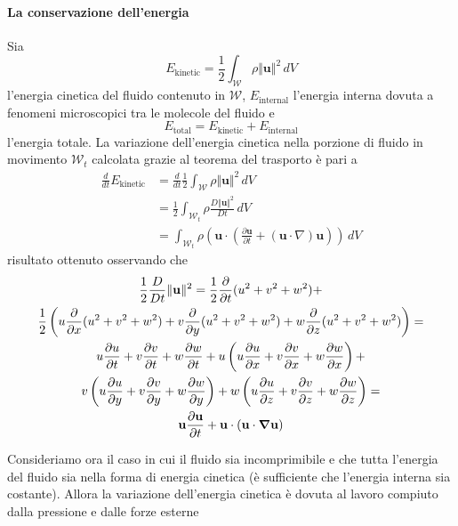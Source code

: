 \paragraph{La conservazione dell'energia}
Sia
\begin{equation*}
E_{\text{kinetic}} = \frac{1}{2} \int_{\mathcal{W}} \rho \Vert \mathbf{u} \Vert^2 \, dV
\end{equation*}
l'energia cinetica del fluido contenuto in $\mathcal{W}$, $E_{\text{internal}}$ l'energia interna dovuta a fenomeni microscopici tra le molecole del fluido e $$E_{\text{total}}=E_{\text{kinetic}}+E_{\text{internal}}$$ l'energia totale.
La variazione dell'energia cinetica nella porzione di fluido in movimento $\mathcal{W}_t$ calcolata grazie al teorema del trasporto è pari a
\begin{align*}
\frac{d}{dt} E_{\text{kinetic}} &= \frac{d}{dt} \frac{1}{2} \int_{\mathcal{W}} \rho \Vert \mathbf{u} \Vert^2 \, dV \\
                                &= \frac{1}{2}  \int_{\mathcal{W}_t} \rho \frac{D\Vert \mathbf{u} \Vert^2}{Dt} \, dV \\
                                &=  \int_{\mathcal{W}_t} \rho ( \mathbf{u} \cdot ( \frac{\partial \mathbf{u}}{\partial t} + (\mathbf{u} \cdot \nabla) \mathbf{u} )) \, dV
\end{align*}
risultato ottenuto osservando che
\begin{multline*}
\frac{1}{2}\frac{D}{Dt}\Vert\mathbf{u}\Vert^2 =
\frac{1}{2}\frac{\partial}{\partial t}(u^2+v^2+w^2)+ \\
\frac{1}{2}\left(u\frac{\partial}{\partial x}(u^2+v^2+w^2)+
v\frac{\partial}{\partial y}(u^2+v^2+w^2)+
w\frac{\partial}{\partial z}(u^2+v^2+w^2)\right) = \\
u\frac{\partial u}{\partial t} + v\frac{\partial v}{\partial t} +w\frac{\partial w}{\partial t} +
u\left(u\frac{\partial u}{\partial x}
+v\frac{\partial v}{\partial x}+w\frac{\partial w}{\partial x}\right)
+ \\ v\left(u\frac{\partial u}{\partial y}
+v\frac{\partial v}{\partial y}+w\frac{\partial w}{\partial y}\right)
 +
w\left(u\frac{\partial u}{\partial z}
+v\frac{\partial v}{\partial z}+w\frac{\partial w}{\partial z}\right) = \\
\mathbf{u}\frac{\partial\mathbf{u}}{\partial t}+\mathbf{u}\cdot(\mathbf{u}\cdot\boldsymbol{\nabla}\mathbf{u})
\end{multline*}


Consideriamo ora il caso in cui il fluido sia incomprimibile e che tutta l'energia del fluido sia nella forma di energia cinetica (è sufficiente che l'energia interna sia costante). Allora la variazione dell'energia cinetica è dovuta al lavoro compiuto dalla pressione e dalle forze esterne

